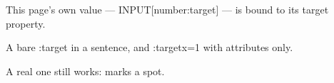 This page's own value — INPUT[number:target] — is bound to its target property.

A bare :target in a sentence, and :target{x=1} with attributes only.

A real one still works:  marks a spot.

